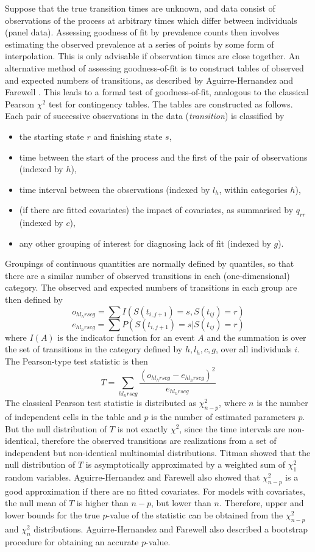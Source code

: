 Suppose that the true transition times are unknown, and data consist
of observations of the process at arbitrary times which differ between
individuals (panel data).  Assessing goodness of fit by prevalence
counts then involves estimating the observed prevalence at a series of
points by some form of interpolation. This is only advisable if
observation times are close together.  An alternative method of
assessing goodness-of-fit is to construct tables of observed and
expected numbers of transitions, as described by Aguirre-Hernandez and
Farewell \cite{ahf}.  This leads to a formal test of goodness-of-fit,
analogous to the classical Pearson $\chi^2$ test for contingency
tables. The tables are constructed as follows.  Each pair of
successive observations in the data (\emph{transition}) is classified
by
\begin{itemize}
\item the starting state $r$ and finishing state $s$,
\item time between the start of the process and the first of the pair
  of observations (indexed by $h$),
\item time interval between the observations (indexed by $l_h$, within
  categories $h$),
\item (if there are fitted covariates) the impact of covariates, as
  summarised by $q_{rr}$ (indexed by $c$),
\item any other grouping of interest for diagnosing lack of fit
  (indexed by $g$).
\end{itemize}
Groupings of continuous quantities are normally defined by quantiles,
so that there are a similar number of observed transitions in each
(one-dimensional) category.  The observed and expected numbers of
transitions in each group are then defined by
\[
o_{hl_h rscg} = \sum I(S(t_{i,j+1}) = s, S(t_{ij}) = r)
\]
\[
e_{hl_h rscg} = \sum P(S(t_{i,j+1}) = s | S(t_{ij}) = r)
\]
where $I(A)$ is the indicator function for an event $A$ and the
summation is over the set of transitions in the category defined by
$h,l_h,c,g$, over all individuals $i$. The Pearson-type test statistic
is then
\[
T = \sum_{hl_h rscg} \frac{(o_{hl_h rscg} - e_{hl_h rscg})^2}{e_{hl_h rscg}}
\]
The classical Pearson test statistic is distributed as $\chi^2_{n-p}$,
where $n$ is the number of independent cells in the table and $p$ is
the number of estimated parameters $p$. But the null distribution of
$T$ is not exactly $\chi^2$, since the time intervals are
non-identical, therefore the observed transitions are realizations
from a set of independent but non-identical multinomial distributions.
Titman \cite{titman:asympnull} showed that the null distribution
of $T$ is asymptotically approximated by a weighted sum of $\chi^2_1$
random variables.   Aguirre-Hernandez and Farewell \cite{ahf} also showed that $\chi^2_{n-p}$
is a good approximation if there are no fitted covariates. For models
with covariates, the null mean of $T$ is higher than $n - p$, but
lower than $n$.  Therefore, upper and lower bounds for the true
$p$-value of the statistic can be obtained from the $\chi^2_{n-p}$ and
$\chi^2_n$ distributions.  Aguirre-Hernandez and Farewell \cite{ahf}
also described a bootstrap procedure for obtaining an accurate $p$-value.

